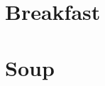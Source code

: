 \mainmatter

\chapter{Breakfast}
\clearpage



\chapter{Soup}
\clearpage



%
%
%
%
%
%
%
%
%
%
%
%
%
